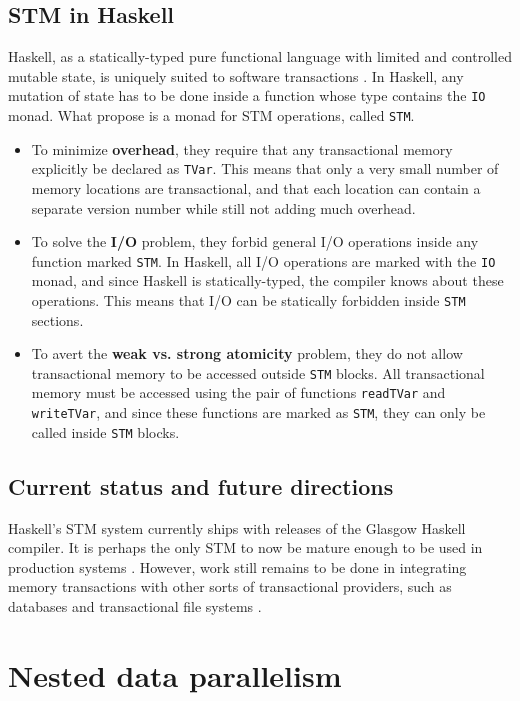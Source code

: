 \documentclass[a4paper]{acmtrans2m}
\begin{document}
\subsection{STM in Haskell}

Haskell, as a statically-typed pure functional language with limited and
controlled mutable state, is uniquely suited to software transactions
\cite{Harris:2005}. In Haskell, any mutation of state has to be done inside a
function whose type contains the \texttt{IO} monad. What 
propose is a monad for STM operations, called \texttt{STM}.

\begin{itemize}
\item To minimize \textbf{overhead}, they require that any transactional memory
  explicitly be declared as \texttt{TVar}. This means that only a very small
  number of memory locations are transactional, and that each location can contain
  a separate version number while still not adding much overhead.
\item To solve the \textbf{I/O} problem, they forbid general I/O operations inside
  any function marked \texttt{STM}. In Haskell, all I/O operations are marked with
  the \texttt{IO} monad, and since Haskell is statically-typed, the compiler knows
  about these operations. This means that I/O can be statically forbidden inside
  \texttt{STM} sections.
\item To avert the \textbf{weak vs. strong atomicity} problem, they do not allow
  transactional memory to be accessed outside \texttt{STM} blocks. All
  transactional memory must be accessed using the pair of functions
  \texttt{readTVar} and \texttt{writeTVar}, and since these functions are marked
  as \texttt{STM}, they can only be called inside \texttt{STM} blocks.
\end{itemize}

\subsection{Current status and future directions}

Haskell's STM system currently ships with releases of the Glasgow Haskell compiler.
It is perhaps the only STM to now be mature enough to be used in production systems
\cite{Stewart:2009}. However, work still remains to be done in integrating memory
transactions with other sorts of transactional providers, such as databases and
transactional file systems \cite{SPJ:2006}.

\section{Nested data parallelism}
\label{sec:dph}
\end{document}
